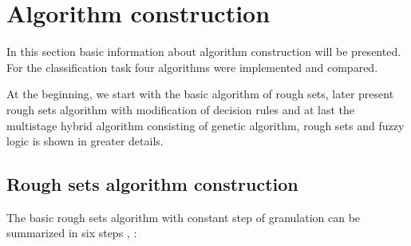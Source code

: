\section{Algorithm construction}
\label{cha:Algorithm_construction}
In this section basic information about algorithm construction will be
presented. For the classification task four algorithms were implemented and
compared.

At the beginning, we start with the basic algorithm of rough sets, later present rough sets
algorithm with modification of decision rules and at last the multistage hybrid 
algorithm consisting of genetic algorithm, rough sets and fuzzy logic is shown in 
greater details. 
\subsection{Rough sets algorithm construction}
\label{cha:Algorithm_construction_rough_set}
The basic rough sets algorithm with constant step of granulation
can be summarized in six steps \cite{bib34}, \cite{bib35}:

